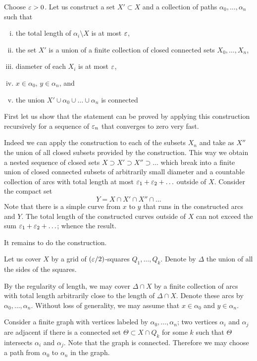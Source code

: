 
Choose $\varepsilon>0$.
Let us construct a set $X'\subset X$ 
 and a collection of paths $\alpha_0,\ldots,\alpha_n$ such that
\begin{enumerate}[(i)]
\item the total length of $\alpha_i\setminus X$ is at most $\varepsilon$,
\item the set $X'$ is a union of a finite collection of closed connected sets $X_0,\ldots,X_n$,
\item diameter of each $X_i$ is at most $\varepsilon$,
\item $x\in\alpha_0$, $y\in\alpha_n$, and
\item the union $X'\cup \alpha_0\cup\ldots\cup\alpha_n$ is connected
\end{enumerate}


First let us show that the statement can be proved by applying this construction recursively for a sequence of $\varepsilon_n$ that converges to zero very fast.

Indeed we can apply the construction to each of the subsets $X_n$ and take as $X''$ the union of all closed subsets provided by the construction.
This way we obtain a nested sequence of closed sets $X\supset X'\supset X''\supset\ldots$ which break into a finite union of closed connected subsets of arbitrarily small diameter and a countable collection of arcs with total length at most $\varepsilon_1+\varepsilon_2+\ldots$
outside of $X$.
Consider the compact set
\[Y= X\cap  X'\cap X''\cap\ldots\]
Note that there is a simple curve from $x$ to $y$ that runs in the constructed arcs and $Y$.
The total length of the constructed curves outside of $X$ can not exceed the sum
$\varepsilon_1+\varepsilon_2+\ldots$;
whence the result.

It remains to do the construction.

Let us cover $X$ by a grid of $(\varepsilon/2)$-squares $Q_1,\ldots,Q_k$.
Denote by $\Delta$ the union of all the sides of the squares.

By the regularity of length, we may cover $\Delta\cap X$ by a finite collection of arcs with total length arbitrarily close to the length of $\Delta\cap X$.
Denote these arcs by $\alpha_0,\ldots,\alpha_n$.
Without loss of generality, we may assume that $x\in\alpha_0$ and $y\in\alpha_n$.

Consider a finite graph with vertices labeled by $\alpha_0,\ldots,\alpha_n$;
two vertices $\alpha_i$ and $\alpha_j$ are adjacent if there is a connected set $\Theta\subset  X\cap Q_k$ 
for some $k$ such that $\Theta$ intersects $\alpha_i$ and $\alpha_j$.
Note that the graph is connected. Therefore we may choose a path from $\alpha_0$ to $\alpha_n$ in the graph.

